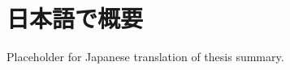 \chapter{日本語で概要}
\label{sec:nihongo_gaiyou}

Placeholder for Japanese translation of thesis summary.